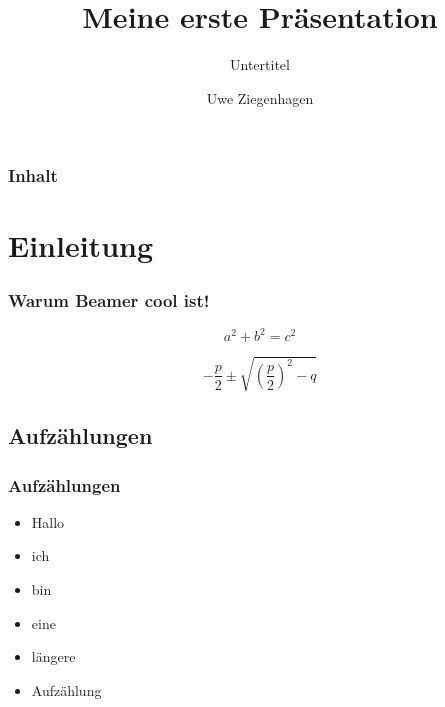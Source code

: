 \documentclass[12pt,ngerman]{beamer}
\author{Uwe Ziegenhagen}
\title{Meine erste Präsentation}
\subtitle{Untertitel}
\institute{Köln}
\begin{document}
\begin{frame}
\transboxout

\maketitle

\end{frame}

\begin{frame}
\frametitle{Inhalt}

\tableofcontents

\end{frame}

\section{Einleitung}


\begin{frame}
\transdissolve
\frametitle{Warum Beamer cool ist!}

\begin{equation}
a^2+b^2=c^2
\end{equation}

\pause

\begin{equation}
-\frac{p}{2} \pm \sqrt{ \left(\frac{p}{2}\right)^2 -q }
\end{equation}

\end{frame}

\subsection{Aufzählungen}

\begin{frame}
\frametitle{Aufzählungen}

\begin{itemize}
\item<2-> Hallo
\item<1> ich 
\item<1,3> bin
\item<4> eine
\item<2-> längere
\item<-3>Aufzählung
\end{itemize}
\end{frame}
\end{document}
